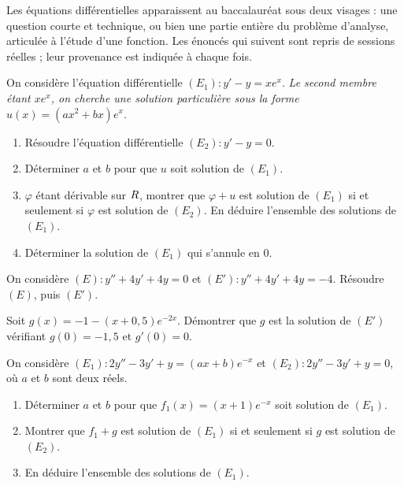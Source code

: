 \begin{annales}
Les équations différentielles apparaissent au baccalauréat sous deux visages :
une question courte et technique, ou bien une partie entière du problème
d'analyse, articulée à l'étude d'une fonction. Les énoncés qui suivent sont
repris de sessions réelles ; leur provenance est indiquée à chaque fois.

On considère l'équation différentielle $(E_{1}) : y'-y = xe^{x}$.
\emph{Le second membre étant $xe^{x}$, on cherche une solution particulière
sous la forme $u(x) = \left(ax^{2}+bx\right)e^{x}$.}
\begin{enumerate}[label=\textbf{\arabic*)}, leftmargin=*, itemsep=0.15em]
  \item Résoudre l'équation différentielle $(E_{2}) : y'-y = 0$.
  \item Déterminer $a$ et $b$ pour que $u$ soit solution de $(E_{1})$.
  \item $\varphi$ étant dérivable sur $R$, montrer que $\varphi+u$ est
        solution de $(E_{1})$ si et seulement si $\varphi$ est solution de
        $(E_{2})$. En déduire l'ensemble des solutions de $(E_{1})$.
  \item Déterminer la solution de $(E_{1})$ qui s'annule en $0$.
\end{enumerate}

On considère $(E) : y''+4y'+4y = 0$ et $(E') : y''+4y'+4y = -4$. Résoudre
$(E)$, puis $(E')$.

Soit $g(x) = -1-(x+0{,}5)e^{-2x}$. Démontrer que $g$ est la solution de
$(E')$ vérifiant $g(0) = -1{,}5$ et $g'(0) = 0$.

On considère $(E_{1}) : 2y''-3y'+y = (ax+b)e^{-x}$ et
$(E_{2}) : 2y''-3y'+y = 0$, où $a$ et $b$ sont deux réels.
\begin{enumerate}[label=\textbf{\arabic*)}, leftmargin=*, itemsep=0.15em]
  \item Déterminer $a$ et $b$ pour que $f_{1}(x) = (x+1)e^{-x}$ soit solution
        de $(E_{1})$.
  \item Montrer que $f_{1}+g$ est solution de $(E_{1})$ si et seulement si $g$
        est solution de $(E_{2})$.
  \item En déduire l'ensemble des solutions de $(E_{1})$.
\end{enumerate}


\end{annales}
